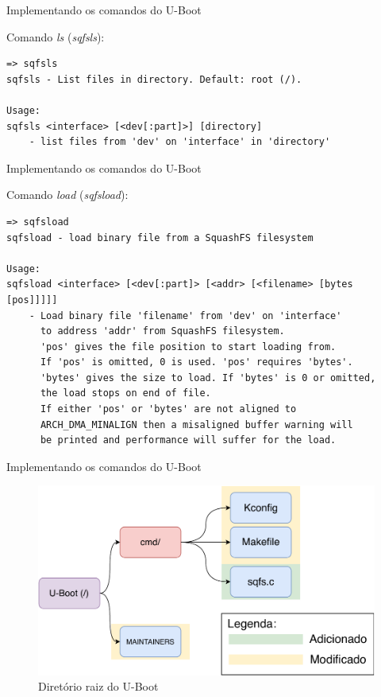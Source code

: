 \begin{frame}[fragile]{Implementando os comandos do U-Boot}

Comando \textit{ls} (\textit{sqfsls}):

\begin{verbatim}
=> sqfsls 
sqfsls - List files in directory. Default: root (/).

Usage:
sqfsls <interface> [<dev[:part]>] [directory]
    - list files from 'dev' on 'interface' in 'directory'

\end{verbatim}
\end{frame}

\begin{frame}[fragile]{Implementando os comandos do U-Boot}

Comando \textit{load} (\textit{sqfsload}):

\begin{verbatim}
=> sqfsload 
sqfsload - load binary file from a SquashFS filesystem

Usage:
sqfsload <interface> [<dev[:part]> [<addr> [<filename> [bytes [pos]]]]]
    - Load binary file 'filename' from 'dev' on 'interface'
      to address 'addr' from SquashFS filesystem.
      'pos' gives the file position to start loading from.
      If 'pos' is omitted, 0 is used. 'pos' requires 'bytes'.
      'bytes' gives the size to load. If 'bytes' is 0 or omitted,
      the load stops on end of file.
      If either 'pos' or 'bytes' are not aligned to
      ARCH_DMA_MINALIGN then a misaligned buffer warning will
      be printed and performance will suffer for the load.
\end{verbatim}

\end{frame}

\begin{frame}{Implementando os comandos do U-Boot}
\begin{figure}
    \centering
    \includegraphics[scale=0.55]{figuras/uboot-commands.pdf}
    \caption{Diretório raiz do U-Boot}
    \label{fig:my_label}
\end{figure}
\end{frame}

